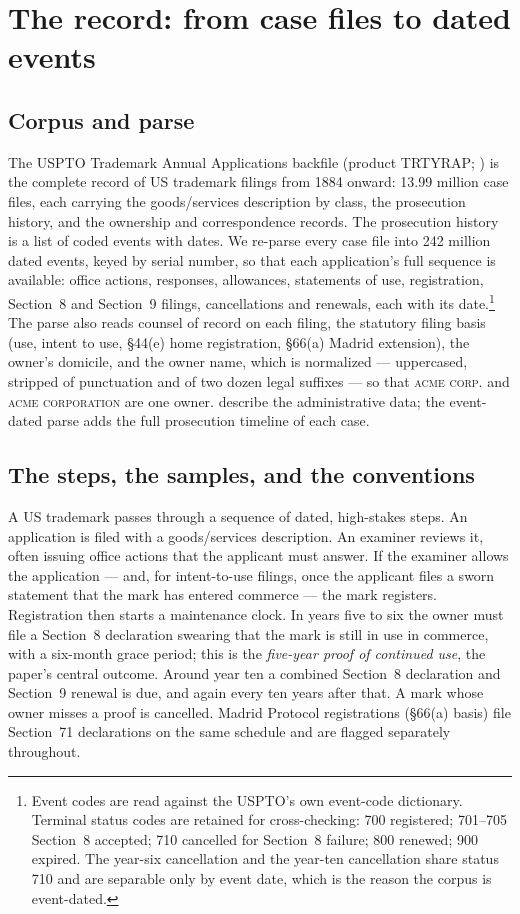 \section{The record: from case files to dated events}\label{sec:record}

\subsection{Corpus and parse}

The USPTO Trademark Annual Applications backfile (product TRTYRAP;
\citealp{USPTOtrtyrap}) is the
complete record of US trademark filings from 1884 onward: 13.99 million
case files, each carrying the goods/services description by class, the
prosecution history, and the ownership and correspondence records. The
prosecution history is a list of coded events with dates. We re-parse
every case file into 242 million dated events, keyed by serial number,
so that each application's full sequence is available: office actions,
responses, allowances, statements of use, registration, Section~8 and
Section~9 filings, cancellations and renewals, each with its
date.\footnote{Event codes are read against the USPTO's own event-code
dictionary. Terminal status codes are retained for cross-checking: 700
registered; 701--705 Section~8 accepted; 710 cancelled for Section~8
failure; 800 renewed; 900 expired. The year-six cancellation and the
year-ten cancellation share status 710 and are separable only by event
date, which is the reason the corpus is event-dated.} The parse also
reads counsel of record on each filing, the statutory filing basis (use,
intent to use, \S44(e) home registration, \S66(a) Madrid extension), the
owner's domicile, and the owner name, which is normalized ---
uppercased, stripped of punctuation and of two dozen legal suffixes ---
so that \textsc{acme corp.} and \textsc{acme corporation} are one owner.
\citet{Graham2013} describe the administrative data; the event-dated
parse adds the full prosecution timeline of each case.

\subsection{The steps, the samples, and the conventions}\label{sec:gates}

A US trademark passes through a sequence of dated, high-stakes steps.
An application is filed with a goods/services description. An examiner
reviews it, often issuing office actions that the applicant must answer.
If the examiner allows the application --- and, for intent-to-use
filings, once the applicant files a sworn statement that the mark has
entered commerce --- the mark registers. Registration then starts a
maintenance clock. In years five to six the owner must file a Section~8
declaration swearing that the mark is still in use in commerce, with a
six-month grace period; this is the \emph{five-year proof of continued
use}, the paper's central outcome. Around year ten a combined Section~8
declaration and Section~9 renewal is due, and again every ten years
after that. A mark whose owner misses a proof is cancelled. Madrid
Protocol registrations (\S66(a) basis) file Section~71 declarations on
the same schedule and are flagged separately throughout.

